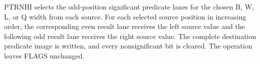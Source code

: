 PTRNHI selects the odd-position significant predicate lanes for the chosen B, W, L, or Q width from each source.
For each selected source position in increasing order, the corresponding even result lane receives the left source value and the following odd result lane receives the right source value.
The complete destination predicate image is written, and every nonsignificant bit is cleared.
The operation leaves FLAGS unchanged.
